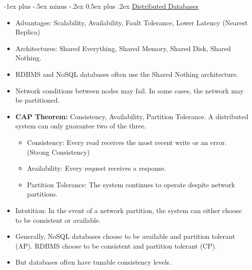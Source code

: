 \documentclass[10pt, landscape]{article}
\makeatletter
\renewcommand{\section}{\@startsection{section}{1}{0mm}%
  {-1ex plus -.5ex minus -.2ex}%
  {0.5ex plus .2ex}%
{\normalfont\large\bfseries}}
\makeatother
\begin{document}
\begin{multicols*}{4}
  \section{\underline{Distributed Databases}}
  \begin{itemize}
    \item Advantages: Scalability, Availability, Fault Tolerance, Lower Latency (Nearest Replica)
    \item Architectures: Shared Everything, Shared Memory, Shared Disk, Shared Nothing.
    \item RDBMS and NoSQL databases often use the Shared Nothing architecture.
    \item Network conditions between nodes may fail. In some cases, the network may be partitioned.
    \item \textbf{CAP Theorem:} Consistency, Availability, Partition Tolerance. A distributed system can only guarantee two of the three.
    \begin{itemize}
      \item Consistency: Every read receives the most recent write or an error. (Strong Consistency)
      \item Availability: Every request receives a response.
      \item Partition Tolerance: The system continues to operate despite network partitions.
    \end{itemize}
    \item Intutition: In the event of a network partition, the system can either choose to be consistent or available.
    \item Generally, NoSQL databases choose to be available and partition tolerant (AP). RDBMS choose to be consistent and partition tolerant (CP).
    \item But databases often have tunable consistency levels.
  \end{itemize}


\end{multicols*}
\end{document}
